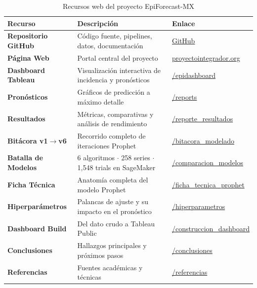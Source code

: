 \documentclass[12pt, letterpaper]{article}
\begin{document}
\begin{table}[H]
\centering
\caption{Recursos web del proyecto EpiForecast-MX}
\label{tab:enlaces}
\small
\begin{tabularx}{\textwidth}{>{\bfseries}l X l}
\toprule
\textbf{Recurso} & \textbf{Descripción} & \textbf{Enlace} \\
\midrule
Repositorio GitHub & Código fuente, pipelines, datos, documentación & \href{https://github.com/IntegradorIMSS2026Team01/EpiForecast-MX}{GitHub} \\
\addlinespace
Página Web & Portal central del proyecto & \href{https://proyectointegrador.org}{proyectointegrador.org} \\
\addlinespace
Dashboard Tableau & Visualización interactiva de incidencia y pronósticos & \href{https://proyectointegrador.org/epidashboard}{/epidashboard} \\
\addlinespace
Pronósticos & Gráficos de predicción a máximo detalle & \href{https://proyectointegrador.org/reports/}{/reports} \\
\addlinespace
Resultados & Métricas, comparativas y análisis de rendimiento & \href{https://proyectointegrador.org/reporte_resultados}{/reporte\_resultados} \\
\addlinespace
Bitácora v1$\to$v6 & Recorrido completo de iteraciones Prophet & \href{https://proyectointegrador.org/bitacora_modelado}{/bitacora\_modelado} \\
\addlinespace
Batalla de Modelos & 6 algoritmos $\cdot$ 258 series $\cdot$ 1,548 trials en SageMaker & \href{https://proyectointegrador.org/comparacion_modelos}{/comparacion\_modelos} \\
\addlinespace
Ficha Técnica & Anatomía completa del modelo Prophet & \href{https://proyectointegrador.org/ficha_tecnica_prophet}{/ficha\_tecnica\_prophet} \\
\addlinespace
Hiperparámetros & Palancas de ajuste y su impacto en el pronóstico & \href{https://proyectointegrador.org/hiperparametros_modelos}{/hiperparametros} \\
\addlinespace
Dashboard Build & Del dato crudo a Tableau Public & \href{https://proyectointegrador.org/construccion_dashboard}{/construccion\_dashboard} \\
\addlinespace
Conclusiones & Hallazgos principales y próximos pasos & \href{https://proyectointegrador.org/conclusiones}{/conclusiones} \\
\addlinespace
Referencias & Fuentes académicas y técnicas & \href{https://proyectointegrador.org/referencias}{/referencias} \\
\bottomrule
\end{tabularx}
\end{table}
\end{document}
